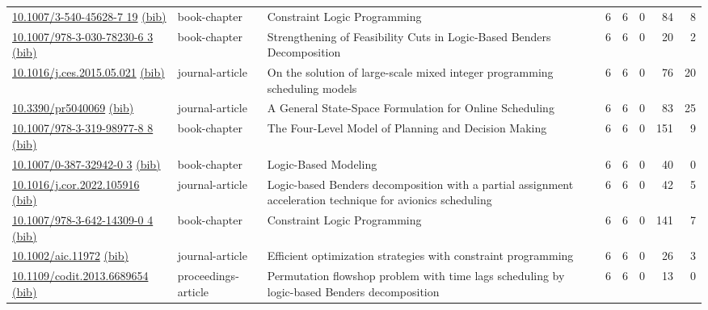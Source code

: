 {\begin{longtable}{p{5cm}lp{11cm}rrrrr}
\href{http://dx.doi.org/10.1007/3-540-45628-7_19}{10.1007/3-540-45628-7 19} \href{https://www.doi2bib.org/bib/10.1007/3-540-45628-7_19}{(bib)} & book-chapter & Constraint Logic Programming & 6 & 6 & 0 & 84 & 8 \\
\href{http://dx.doi.org/10.1007/978-3-030-78230-6_3}{10.1007/978-3-030-78230-6 3} \href{https://www.doi2bib.org/bib/10.1007/978-3-030-78230-6_3}{(bib)} & book-chapter & Strengthening of Feasibility Cuts in Logic-Based Benders Decomposition & 6 & 6 & 0 & 20 & 2 \\
\href{http://dx.doi.org/10.1016/j.ces.2015.05.021}{10.1016/j.ces.2015.05.021} \href{https://www.doi2bib.org/bib/10.1016/j.ces.2015.05.021}{(bib)} & journal-article & On the solution of large-scale mixed integer programming scheduling models & 6 & 6 & 0 & 76 & 20 \\
\href{http://dx.doi.org/10.3390/pr5040069}{10.3390/pr5040069} \href{https://www.doi2bib.org/bib/10.3390/pr5040069}{(bib)} & journal-article & A General State-Space Formulation for Online Scheduling & 6 & 6 & 0 & 83 & 25 \\
\href{http://dx.doi.org/10.1007/978-3-319-98977-8_8}{10.1007/978-3-319-98977-8 8} \href{https://www.doi2bib.org/bib/10.1007/978-3-319-98977-8_8}{(bib)} & book-chapter & The Four-Level Model of Planning and Decision Making & 6 & 6 & 0 & 151 & 9 \\
\href{http://dx.doi.org/10.1007/0-387-32942-0_3}{10.1007/0-387-32942-0 3} \href{https://www.doi2bib.org/bib/10.1007/0-387-32942-0_3}{(bib)} & book-chapter & Logic-Based Modeling & 6 & 6 & 0 & 40 & 0 \\
\href{http://dx.doi.org/10.1016/j.cor.2022.105916}{10.1016/j.cor.2022.105916} \href{https://www.doi2bib.org/bib/10.1016/j.cor.2022.105916}{(bib)} & journal-article & Logic-based Benders decomposition with a partial assignment acceleration technique for avionics scheduling & 6 & 6 & 0 & 42 & 5 \\
\href{http://dx.doi.org/10.1007/978-3-642-14309-0_4}{10.1007/978-3-642-14309-0 4} \href{https://www.doi2bib.org/bib/10.1007/978-3-642-14309-0_4}{(bib)} & book-chapter & Constraint Logic Programming & 6 & 6 & 0 & 141 & 7 \\
\href{http://dx.doi.org/10.1002/aic.11972}{10.1002/aic.11972} \href{https://www.doi2bib.org/bib/10.1002/aic.11972}{(bib)} & journal-article & Efficient optimization strategies with constraint programming & 6 & 6 & 0 & 26 & 3 \\
\href{http://dx.doi.org/10.1109/codit.2013.6689654}{10.1109/codit.2013.6689654} \href{https://www.doi2bib.org/bib/10.1109/codit.2013.6689654}{(bib)} & proceedings-article & Permutation flowshop problem with time lags scheduling by logic-based Benders decomposition & 6 & 6 & 0 & 13 & 0 \\

\end{longtable}}
